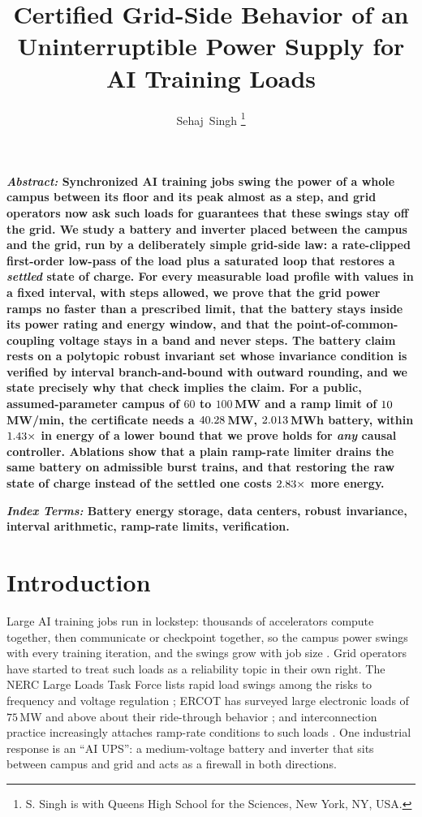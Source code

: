 \documentclass[journal]{IEEEtran}
\theoremstyle{remark}
\begin{document}
\title{Certified Grid-Side Behavior of an Uninterruptible Power Supply for AI Training Loads}
\author{Sehaj~Singh%
\thanks{S. Singh is with Queens High School for the Sciences, New York, NY, USA.}}

\maketitle

{\small\noindent\bfseries\textit{Abstract:}
Synchronized AI training jobs swing the power of a whole campus between its floor and its peak almost as a step,
and grid operators now ask such loads for guarantees that these swings stay off the grid.
We study a battery and inverter placed between the campus and the grid, run by a deliberately simple grid-side
law: a rate-clipped first-order low-pass of the load plus a saturated loop that restores a \emph{settled} state of
charge. For every measurable load profile with values in a fixed interval, with steps allowed, we prove that the grid
power ramps no faster than a prescribed limit, that the battery stays inside its power rating and energy window,
and that the point-of-common-coupling voltage stays in a band and never steps.
The battery claim rests on a polytopic robust invariant set whose invariance condition is verified by interval
branch-and-bound with outward rounding, and we state precisely why that check implies the claim.
For a public, assumed-parameter campus of $60$ to $100$\,MW and a ramp limit of $10$\,MW/min, the certificate
needs a $40.28$\,MW, $2.013$\,MWh battery, within $1.43\times$ in energy of a lower bound that we prove holds for
\emph{any} causal controller. Ablations show that a plain ramp-rate limiter drains the same battery on admissible
burst trains, and that restoring the raw state of charge instead of the settled one costs $2.83\times$ more
energy.\par}
\smallskip

{\small\noindent\bfseries\textit{Index Terms:}
Battery energy storage, data centers, robust invariance, interval arithmetic, ramp-rate limits, verification.\par}
\medskip

\section{Introduction}
Large AI training jobs run in lockstep: thousands of accelerators compute together, then communicate or
checkpoint together, so the campus power swings with every training iteration, and the swings grow with job size
\cite{choukse2025}. Grid operators have started to treat such loads as a reliability topic in their own right.
The NERC Large Loads Task Force lists rapid load swings among the risks to frequency and voltage regulation
\cite{nerc2025}; ERCOT has surveyed large electronic loads of $75$\,MW and above about their ride-through behavior
\cite{ercot2025}; and interconnection practice increasingly attaches ramp-rate conditions to such loads
\cite{zahedi2026}. One industrial response is an ``AI UPS'': a medium-voltage battery and inverter that sits between
campus and grid and acts as a firewall in both directions.
\end{document}
